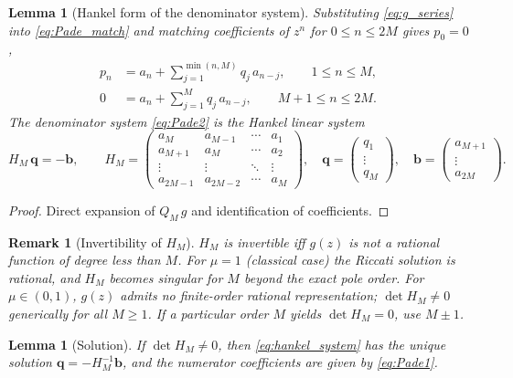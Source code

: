 \documentclass[11pt,a4paper]{article}
\newtheorem{lemma}[theorem]{Lemma}
\newtheorem{remark}[theorem]{Remark}
\begin{document}
\begin{lemma}[Hankel form of the denominator system]\label{lem:hankel}
Substituting \eqref{eq:g_series} into \eqref{eq:Pade_match} and matching coefficients of \(z^n\) for \(0\le n\le 2M\) gives \(p_0=0\),
\begin{align}
p_n &= a_n+\sum_{j=1}^{\min(n,M)}q_j\,a_{n-j},\qquad 1\le n\le M,\label{eq:Pade1}\\
0 &= a_n+\sum_{j=1}^{M}q_j\,a_{n-j},\qquad M+1\le n\le 2M.\label{eq:Pade2}
\end{align}
The denominator system \eqref{eq:Pade2} is the Hankel linear system
\begin{equation}\label{eq:hankel_system}
H_M\,\bm{q}=-\bm{b},\qquad
H_M=\begin{pmatrix}
a_M & a_{M-1} & \cdots & a_1\\
a_{M+1} & a_M & \cdots & a_2\\
\vdots & \vdots & \ddots & \vdots\\
a_{2M-1} & a_{2M-2} & \cdots & a_M
\end{pmatrix},\quad
\bm{q}=\begin{pmatrix}q_1\\\vdots\\q_M\end{pmatrix},\quad
\bm{b}=\begin{pmatrix}a_{M+1}\\\vdots\\a_{2M}\end{pmatrix}.
\end{equation}
\end{lemma}

\begin{proof}
Direct expansion of \(Q_M\,g\) and identification of coefficients.
\end{proof}

\begin{remark}[Invertibility of \(H_M\)]\label{rem:HM_invertible}
\(H_M\) is invertible iff \(g(z)\) is not a rational function of degree less than \(M\).
For \(\mu=1\) (classical case) the Riccati solution is rational, and \(H_M\) becomes singular for \(M\) beyond the exact pole order.
For \(\mu\in(0,1)\), \(g(z)\) admits no finite-order rational representation; \(\det H_M\ne 0\) generically for all \(M\ge1\).
If a particular order \(M\) yields \(\det H_M=0\), use \(M\pm 1\).
\end{remark}

\begin{lemma}[Solution]\label{lem:Pade_system}
If \(\det H_M\neq0\), then \eqref{eq:hankel_system} has the unique solution \(\bm{q}=-H_M^{-1}\bm{b}\), and the numerator coefficients are given by \eqref{eq:Pade1}.
\end{lemma}
\end{document}
